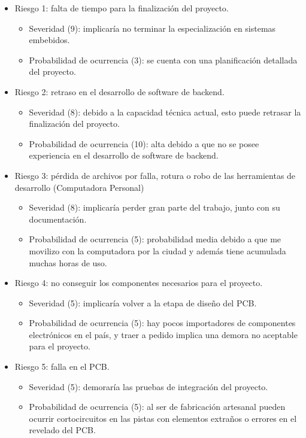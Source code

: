 \documentclass[11pt]{charter}
\begin{document}
\begin{itemize}
\item Riesgo 1: falta de tiempo para la finalización del proyecto.
	\begin{itemize}
	\item Severidad (9): implicaría no terminar la especialización en sistemas embebidos.
	\item Probabilidad de ocurrencia (3): se cuenta con una planificación detallada del proyecto. 
	\end{itemize} 

\item Riesgo 2: retraso en el desarrollo de software de backend.
	\begin{itemize}
	\item Severidad (8): debido a la capacidad técnica actual, esto puede retrasar la finalización del proyecto.
	\item Probabilidad de ocurrencia (10): alta debido a que no se posee experiencia en el desarrollo de software de backend. 
	\end{itemize}
	
\item Riesgo 3: pérdida de archivos por falla, rotura o robo de las herramientas de desarrollo (Computadora Personal)
	\begin{itemize}
	\item Severidad (8): implicaría perder gran parte del trabajo, junto con su documentación.
	\item Probabilidad de ocurrencia (5): probabilidad media debido a que me movilizo con la computadora por la ciudad y además tiene acumulada muchas horas de uso.
	\end{itemize}
	
\item Riesgo 4: no conseguir los componentes necesarios para el proyecto.
	\begin{itemize}
	\item Severidad (5): implicaría volver a la etapa de diseño del PCB.
	\item Probabilidad de ocurrencia (5): hay pocos importadores de componentes electrónicos en el país, y traer a pedido implica una demora no aceptable para el proyecto.
	\end{itemize}
	
\item Riesgo 5: falla en el PCB.
	\begin{itemize}
	\item Severidad (5): demoraría las pruebas de integración del proyecto.
	\item Probabilidad de ocurrencia (5): al ser de fabricación artesanal pueden ocurrir cortocircuitos en las pistas con elementos extraños o errores en el revelado del PCB. 
	\end{itemize}
\end{itemize} 
\end{document}
